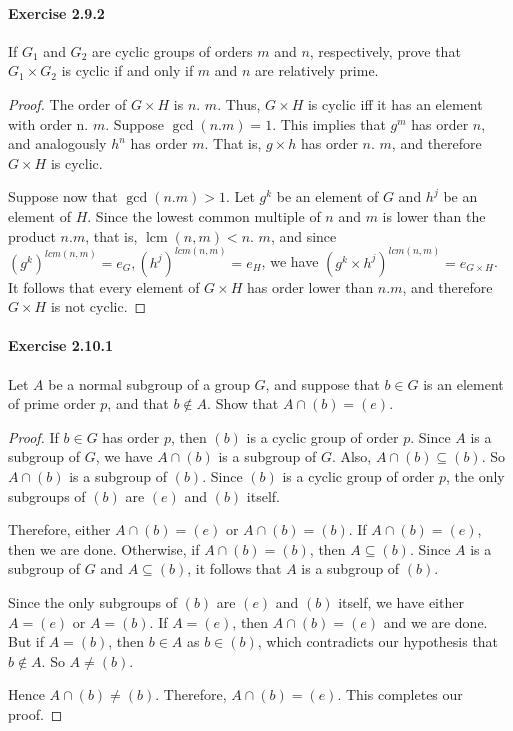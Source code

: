 \documentclass{article}
\begin{document}
\paragraph{Exercise 2.9.2} If $G_1$ and $G_2$ are cyclic groups of orders $m$ and $n$, respectively, prove that $G_1 \times G_2$ is cyclic if and only if $m$ and $n$ are relatively prime.
\begin{proof}
    The order of $G \times H$ is $n$. $m$. Thus, $G \times H$ is cyclic iff it has an element with order n. $m$. Suppose $\operatorname{gcd}(n . m)=1$. This implies that $g^m$ has order $n$, and analogously $h^n$ has order $m$. That is, $g \times h$ has order $n$. $m$, and therefore $G \times H$ is cyclic.

Suppose now that $\operatorname{gcd}(n . m)>1$. Let $g^k$ be an element of $G$ and $h^j$ be an element of $H$. Since the lowest common multiple of $n$ and $m$ is lower than the product $n . m$, that is, $\operatorname{lcm}(n, m)<n$. $m$, and since $\left(g^k\right)^{l c m(n, m)}=e_G,\left(h^j\right)^{l c m(n, m)}=e_H$, we have $\left(g^k \times h^j\right)^{l c m(n, m)}=e_{G \times H}$. It follows that every element of $G \times H$ has order lower than $n . m$, and therefore $G \times H$ is not cyclic.
\end{proof}



\paragraph{Exercise 2.10.1} Let $A$ be a normal subgroup of a group $G$, and suppose that $b \in G$ is an element of prime order $p$, and that $b \not\in A$. Show that $A \cap (b) = (e)$.
\begin{proof}
If $b \in G$ has order $p$, then $(b)$ is a cyclic group of order $p$. Since $A$ is a subgroup of $G$, we have $A \cap (b)$ is a subgroup of $G$. Also, $A \cap (b) \subseteq (b)$. So $A \cap (b)$ is a subgroup of $(b)$. Since $(b)$ is a cyclic group of order $p$, the only subgroups of $(b)$ are $(e)$ and $(b)$ itself.

Therefore, either $A \cap (b) = (e)$ or $A \cap (b) = (b)$. If $A \cap (b) = (e)$, then we are done. Otherwise, if $A \cap (b) = (b)$, then $A \subseteq (b)$. Since $A$ is a subgroup of $G$ and $A \subseteq (b)$, it follows that $A$ is a subgroup of $(b)$.

Since the only subgroups of $(b)$ are $(e)$ and $(b)$ itself, we have either $A = (e)$ or $A = (b)$. If $A = (e)$, then $A \cap (b) = (e)$ and we are done. But if $A = (b)$, then $b \in A$ as $b \in (b)$, which contradicts our hypothesis that $b \notin A$. So $A \neq (b)$.

Hence $A \cap (b) \neq (b)$. Therefore, $A \cap (b) = (e)$. This completes our proof.
\end{proof}
\end{document}
